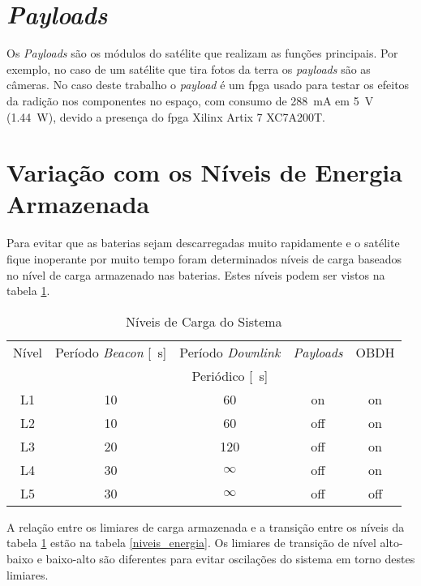 \section{\textit{Payloads}}

Os \textit{Payloads} são os módulos do satélite que realizam as funções principais. Por exemplo, no caso de um satélite que tira fotos da terra os \textit{payloads} são as câmeras. No caso deste trabalho o \textit{payload} é um \gls{fpga} usado para testar os efeitos da radição nos componentes no espaço, com consumo de \SI{288}{\milli\ampere} em \SI{5}{\volt} (\SI{1.44}{\watt}), devido a presença do \gls{fpga} Xilinx Artix 7 XC7A200T.


\section{Variação com os Níveis de Energia Armazenada} \label{secao:variacao_niveis_energia}

Para evitar que as baterias sejam descarregadas muito rapidamente e o satélite fique inoperante por muito tempo foram determinados níveis de carga baseados no nível de carga armazenado nas baterias. Estes níveis podem ser vistos na tabela \ref{niveis_carga}.

\begin{table}[!htpb]
\centering
\begin{tabular}{c c c c c}
\\ \hline
Nível & Período \textit{Beacon} [\SI{}{\second}] & Período \textit{Downlink} & \textit{Payloads} & OBDH \\ 
& &  Periódico [\SI{}{\second}] & & \\ \hline \hline
L1 & 10 & 60 & on & on \\
L2 & 10 & 60 & off & on \\
L3 & 20 & 120 & off & on \\
L4 & 30 & \(\infty\) & off & on \\
L5 & 30 & \(\infty\) & off & off \\ \hline
\end{tabular}
\caption{Níveis de Carga do Sistema}
\label{niveis_carga}
\end{table}

A relação entre os limiares de carga armazenada e a transição entre os níveis da tabela \ref{niveis_carga} estão na tabela \ref{niveis_energia}. Os limiares de transição de nível alto-baixo e baixo-alto são diferentes para evitar oscilações do sistema em torno destes limiares.

